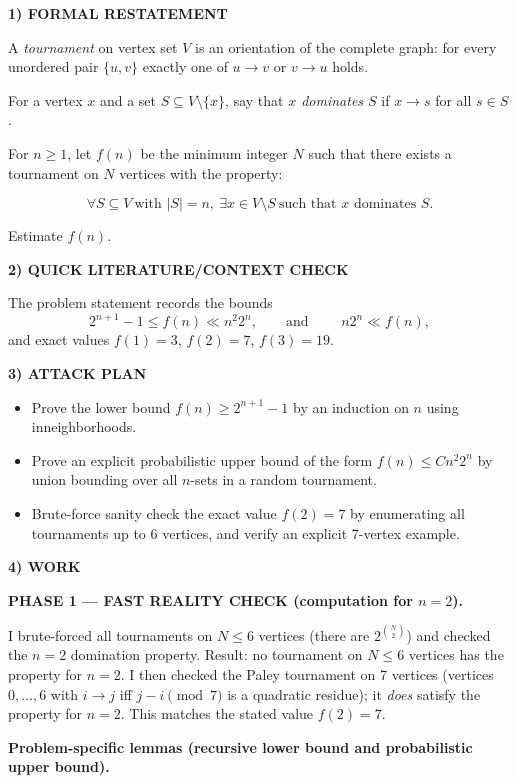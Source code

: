 

\noindent\textbf{1) FORMAL RESTATEMENT}

A \emph{tournament} on vertex set $V$ is an orientation of the complete graph:
for every unordered pair $\{u,v\}$ exactly one of $u\to v$ or $v\to u$ holds.

For a vertex $x$ and a set $S\subseteq V\setminus\{x\}$, say that \emph{$x$
dominates $S$} if $x\to s$ for all $s\in S$.

For $n\ge 1$, let $f(n)$ be the minimum integer $N$ such that there exists a
tournament on $N$ vertices with the property:

\[ \forall S\subseteq V\ \text{with }|S|=n,\ \exists x\in V\setminus S\ \text{such that }x\text{ dominates }S. \]

Estimate $f(n)$.

\medskip
\noindent\textbf{2) QUICK LITERATURE/CONTEXT CHECK}

The problem statement records the bounds
\[2^{n+1}-1\le f(n)\ll n^2 2^n,\qquad\text{and }\qquad n2^n\ll f(n),
\]
and exact values $f(1)=3$, $f(2)=7$, $f(3)=19$.

\medskip
\noindent\textbf{3) ATTACK PLAN}

\begin{itemize}
\item Prove the lower bound $f(n)\ge 2^{n+1}-1$ by an induction on $n$ using
inneighborhoods.
\item Prove an explicit probabilistic upper bound of the form
$f(n)\le C n^2 2^n$ by union bounding over all $n$-sets in a random tournament.
\item Brute-force sanity check the exact value $f(2)=7$ by enumerating all
tournaments up to 6 vertices, and verify an explicit 7-vertex example.
\end{itemize}

\medskip
\noindent\textbf{4) WORK}

\textbf{PHASE 1 — FAST REALITY CHECK (computation for $n=2$).}

I brute-forced all tournaments on $N\le 6$ vertices (there are $2^{\binom{N}{2}}$)
and checked the $n=2$ domination property.
Result: no tournament on $N\le 6$ vertices has the property for $n=2$.
I then checked the Paley tournament on 7 vertices (vertices $0,\dots,6$ with
$i\to j$ iff $j-i\pmod 7$ is a quadratic residue); it \emph{does} satisfy the
property for $n=2$.
This matches the stated value $f(2)=7$.

\medskip
\textbf{Problem-specific lemmas (recursive lower bound and probabilistic upper bound).}

